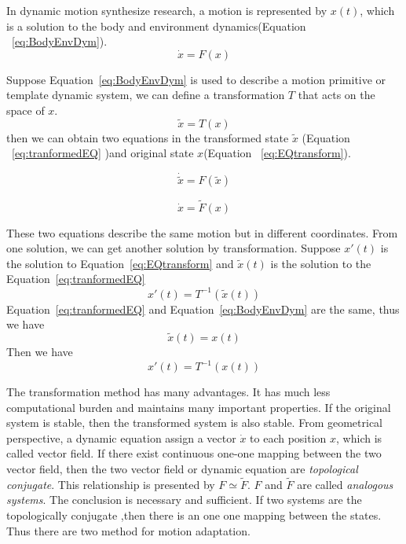 In dynamic motion synthesize research, a motion is represented by $x(t)$, which is a solution to the body and environment dynamics(Equation ~\ref{eq:BodyEnvDym}).
\begin{equation}
\dot{x}=F(x)
\label{eq:BodyEnvDym}
\end{equation}


Suppose Equation~\ref{eq:BodyEnvDym} is used to describe a motion primitive or template dynamic system,
 we can define a transformation $T$ that acts on the space of $x$.
\[
\tilde{x}=T(x)
\]
then we can obtain two equations in  the transformed state $\tilde{x}$ (Equation ~\ref{eq:tranformedEQ} )and original state $x$(Equation ~\ref{eq:EQtransform}).

\begin{equation}
\dot{\tilde{x}}=F(\tilde{x})
\label{eq:tranformedEQ}
\end{equation}

\begin{equation}
\dot{x}=\tilde{F}(x)
\label{eq:EQtransform}
\end{equation}

These two equations describe the same motion but in different coordinates.
From one solution, we can get another solution by transformation.
Suppose $x'(t)$ is the solution to Equation~\ref{eq:EQtransform} and $\tilde{x}(t)$ is the solution to the Equation~\ref{eq:tranformedEQ}
\[
x'(t)=T^{-1}(\tilde{x}(t))
\]
Equation~\ref{eq:tranformedEQ} and Equation~\ref{eq:BodyEnvDym} are the same, thus we have
\[
\tilde{x}(t)=x(t)
\]
Then we have
\[
x'(t)=T^{-1}(x(t))
\]




%
%
The  transformation method has many advantages.
It has much less computational burden and maintains many important properties.
If the original system is stable, then the transformed system is also stable.
%
%
From geometrical perspective, a dynamic equation assign a vector $\dot{x}$ to each position $x$, which is called vector field.
If there exist continuous one-one mapping between the two vector field, then the two vector field  or dynamic equation are \emph{topological conjugate}.
This relationship is presented by $F \simeq \tilde{F}$.
$F$ and $\tilde{F}$ are called \emph{analogous systems}.
The conclusion is necessary and sufficient.
If two systems are the topologically conjugate ,then there is an one one mapping between the states.
Thus there are two method for motion adaptation.

